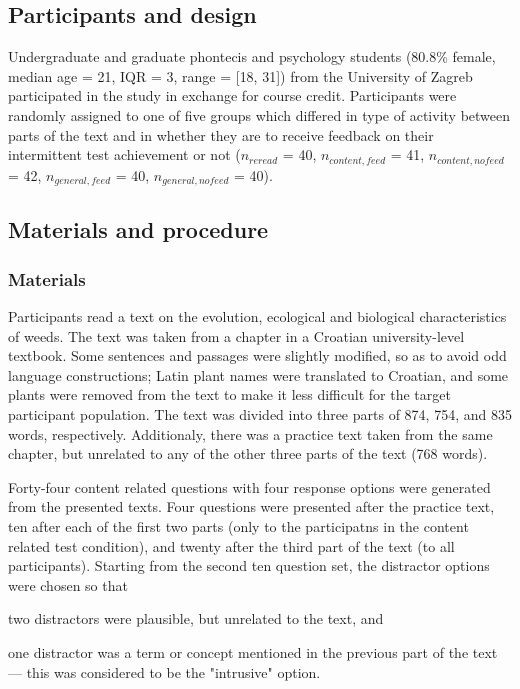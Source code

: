\documentclass[12pt,]{article}
\title{}
\author{}
\date{}
\begin{document}
\hypertarget{participants-and-design}{%
\subsection{Participants and design}\label{participants-and-design}}

Undergraduate and graduate phontecis and psychology students (80.8\%
female, median age = 21, IQR = 3, range = {[}18, 31{]}) from the
University of Zagreb participated in the study in exchange for course
credit. Participants were randomly assigned to one of five groups which
differed in type of activity between parts of the text and in whether
they are to receive feedback on their intermittent test achievement or
not (\(n_{reread}\) = 40, \(n_{content, feed}\) = 41,
\(n_{content, nofeed}\) = 42, \(n_{general, feed}\) = 40,
\(n_{general, nofeed}\) = 40).

\hypertarget{materials-and-procedure}{%
\subsection{Materials and procedure}\label{materials-and-procedure}}

\hypertarget{materials}{%
\subsubsection{Materials}\label{materials}}

Participants read a text on the evolution, ecological and biological
characteristics of weeds. The text was taken from a chapter in a
Croatian university-level textbook. Some sentences and passages were
slightly modified, so as to avoid odd language constructions; Latin
plant names were translated to Croatian, and some plants were removed
from the text to make it less difficult for the target participant
population. The text was divided into three parts of 874, 754, and 835
words, respectively. Additionaly, there was a practice text taken from
the same chapter, but unrelated to any of the other three parts of the
text (768 words). \vspace{\parskip}

\parbox{\textwidth}{
Forty-four content related questions with four response options were generated
from the presented texts. Four questions were presented after the practice text,
ten after each of the first two parts (only to the participatns in the content
related test condition), and twenty after the third part of the text (to all
participants).
Starting from the second ten question set, the distractor options were chosen so that
\begin{enumerate*}[label = (\alph*)]
\item two distractors were plausible, but unrelated to the text, and
\item one distractor was a term or concept mentioned in the previous part of the
text --- this was considered to be the "intrusive" option.
\end{enumerate*}}
\end{document}
